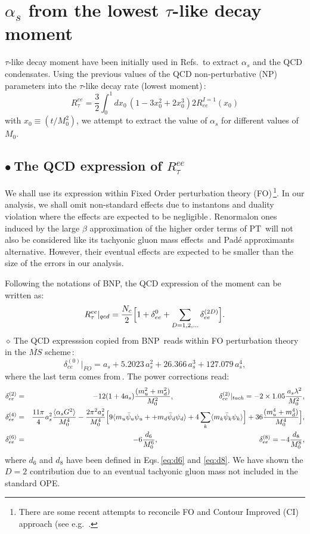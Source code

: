 \documentclass[review]{elsarticle}
\def\beq{\begin{equation}}
\def\eeq{\end{equation}}
\def\bea{\begin{eqnarray}}
\def\eea{\end{eqnarray}}
\def\nnb{\nonumber}
\def\nnb{\nonumber}
\def\la{\langle}
\def\ra{\rangle}
\def\b{$\bullet~$}
\def\d{$\diamond~$}
\begin{document}
  \section{$\alpha_s$ from the lowest $\tau$-like decay moment}
  $\tau$-like decay moment have been initially used in Refs.\,\cite{SNPICH,SN95} to extract $\alpha_s$ and the QCD condensates. 
  Using the previous values of the QCD non-perturbative (NP) parameters into the $\tau$-like decay rate (lowest moment)\,\cite{BNP}:
  \beq
  R^{ee}_{\tau}=\frac{3}{2}\int_0^{1} dx_0\, (1-3x_0^2+2x_0^3)2R^{I=1}_{ee}(x_0)
  \eeq
  with $x_0\equiv (t/M^2_0)$, we attempt to extract the value of $\alpha_s$ for different values of $M_0$.
  \subsection*{\b The QCD expression of $ R^{ee}_{\tau}$}
 We shall use its expression  within Fixed Order perturbation theory (FO)\,\footnote{There are some recent attempts to reconcile FO and Contour Improved (CI) approach (see e.g. \,\cite{JAMIN}.}. In our analysis, we shall omit non-standard effects due to  instantons and duality violation where the effects are expected to be negligible\,\cite{PICH2,SNTAU}.  Renormalon ones induced by the large $\beta$ approximation of the higher order terms of PT\,\cite{RENORM,AYALA} will not also be considered like its tachyonic gluon mass effects\,\cite{ZAKA} and Pad\'e approximants alternative. However, their eventual effects are expected to be smaller than the size of the errors in our analysis. 
  
  Following the notations of BNP, the QCD expression of the moment can be written as:
  \beq
  R^{ee}_{\tau}\vert_{qcd}= \frac{N_c}{2}\Big{[} 1+\delta_{ee}^{0}+\sum_{D=1,2,\dots}\delta_{ee}^{(2D)}\Big{]}.
  \eeq
 \d The QCD expresssion copied from BNP\,\cite{BNP} reads within FO perturbation theory in the $\overline{MS}$ scheme\,:
  \beq
  \delta^{(0)}_{ee}\vert_{FO}=a_s+5.2023\,a_s^2+26.366\,a_s^3+ 127.079\,a_s^4,
  \eeq
  where the last term comes from\,\cite{CHET4}.  The power corrections read:
  \bea
   \delta^{(2)}_{ee}&=&-12(1+4a_s)\frac{(m_u^2+m_d^2)}{M_0^2},\,\,\,\,\,\,\,\,\,\,\,\,\,\,\,\,\,\,\,\,\,\,\,\,\,\,\,\,\,\,\,\,\,\,\,\,\,
   \delta^{(2)}_{ee}\vert_{tach}=-2\times 1.05\frac{\,a_s\lambda^2}{M_0^2},\nnb\\
   \delta^{(4)}_{ee}&=&\frac{11\pi}{4}a_s^2\frac{\la\alpha_s G^2\ra}{M_0^4}
  -\frac{2\pi^2a_s^2}{M_0^4}\Big{[} 9\la m_u\bar \psi_u\psi_u++m_d\bar\psi_d\psi_d \ra+4\sum_k \la m_k\bar \psi_k\psi_k\ra\Big{]}+36\frac{(m_u^4+m_d^4)}{M_0^4}\Big{]},\nnb\\
   \delta^{(6)}_{ee}&=& -6\frac{d_6}{M_0^6},\,\,\,\,\,\,\,\,\,\,\,\,\,\,\,\,\,\,\,\,\,\,\,\,\,\,\,\,\,\,\,\,\,\,\,\,\,\,\,\,\,\,\,\,\,\,\,\,\,\,\,\,\,\,\,\,\,\,\,\,\,\,\,\,\,\,\,\,\,\,\,\,\,\,\,\,\,\,\,\,\,\,\,
   \delta_{ee}^{(8)}= -4\frac{d_8}{M_0^8},
  \eea
  where $d_{6}$ and $d_{8}$ have been defined in Eqs.\,\ref{eq:d6} and \ref{eq:d8}. We have shown the $D=2$ contribution due to an eventual tachyonic gluon mass not included in the standard OPE. 
  
\end{document}
